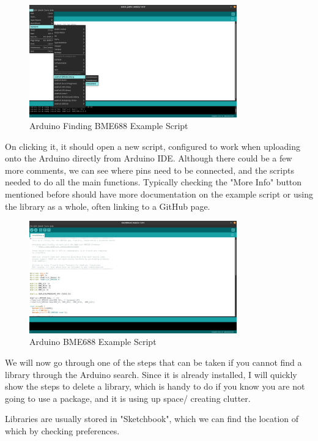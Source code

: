 \documentclass[a4paper,11pt]{report}
\begin{document}
\begin{figure}[H]
\centering
\includegraphics[width=0.8\textwidth]{screenshots/arduinobme688examplescriptfind}
\caption{Arduino Finding BME688 Example Script}
\end{figure}

On clicking it, it should open a new script, configured to work when uploading onto the Arduino directly from Arduino IDE. Although there could be a few more comments, we can see where pins need to be connected, and the scripts needed to do all the main functions. Typically checking the "More Info" button mentioned before should have more documentation on the example script or using the library as a whole, often linking to a GitHub page.

\begin{figure}[H]
\centering
\includegraphics[width=0.8\textwidth]{screenshots/arduinobme688examplescript}
\caption{Arduino BME688 Example Script}
\end{figure}

We will now go through one of the steps that can be taken if you cannot find a library through the Arduino search. Since it is already installed, I will quickly show the steps to delete a library, which is handy to do if you know you are not going to use a package, and it is using up space/ creating clutter.

Libraries are usually stored in "Sketchbook", which we can find the location of which by checking preferences.
\end{document}
